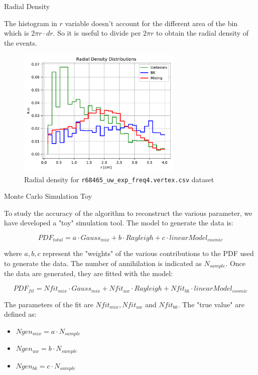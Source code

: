 \documentclass[9pt]{beamer}
\begin{document}
\begin{frame}{Radial Density}

The histogram in $r$ variable doesn't account for the different area of the bin which is $2 \pi r \cdot dr$. So it is useful to divide per $2 \pi r$ to obtain the radial density of the events.

\begin{figure}[hbtp]
\centering
\includegraphics[width = 0.7\textwidth]{RadialDensity.pdf}
\caption{Radial density for \texttt{r68465\_uw\_exp\_freq4.vertex.csv} dataset}
\end{figure}
\end{frame}

\begin{frame}[t]{Monte Carlo Simulation Toy}

To study the accuracy of the algorithm to reconstruct the various parameter, we have developed a "toy" simulation tool. The model to generate the data is:

\begin{equation}
PDF_{total} = a \cdot Gauss_{mix} + b \cdot Rayleigh + c \cdot linearModel_{cosmic} 
\end{equation}

where $a,b,c$ represent the "weights" of the various contributions to the PDF used to generate the data. The number of annihilation is indicated as $N_{sample}$. Once the data are generated, they are fitted with the model:

\begin{equation}
PDF_{fit} = Nfit_{mix} \cdot Gauss_{mix} + Nfit_{uw} \cdot Rayleigh + Nfit_{bk} \cdot linearModel_{cosmic}
\end{equation}

The parameters of the fit are $Nfit_{mix}, Nfit_{uw}$ and $Nfit_{bk}$. The "true value" are defined as:

\begin{itemize}
\centering
\item $Ngen_{mix} = a \cdot N_{sample}$
\item $Ngen_{uw}  = b \cdot N_{sample}$
\item $Ngen_{bk}  = c \cdot N_{sample}$
\end{itemize} 
\end{frame}
\end{document}
